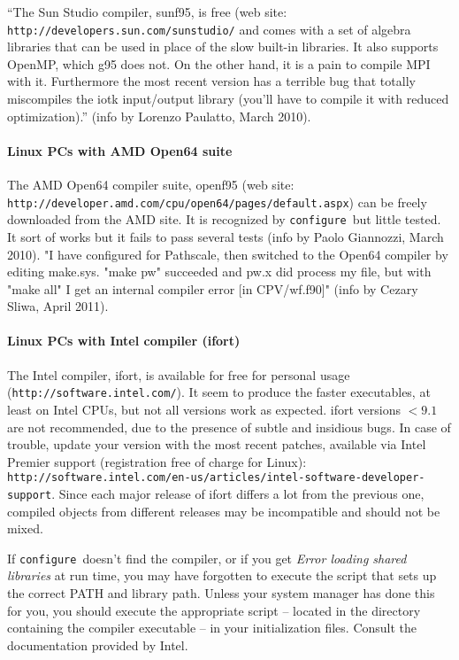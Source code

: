 \documentclass[12pt,a4paper]{article}
\def\configure{\texttt{configure}}
\begin{document}
``The Sun Studio compiler, sunf95, is free (web site:
\texttt{http://developers.sun.com/sunstudio/} and comes  
with a set of algebra libraries that can be used in place of the slow 
built-in libraries. It also supports OpenMP, which g95 does not. On the 
other hand, it is a pain to compile MPI with it. Furthermore the most
recent version has a terrible bug that totally miscompiles the iotk 
input/output library (you'll have to compile it with reduced optimization).''
(info by Lorenzo Paulatto, March 2010).

\paragraph{Linux PCs with AMD Open64 suite}

The AMD Open64 compiler suite, openf95 (web site:
\texttt{http://developer.amd.com/cpu/open64/pages/default.aspx})
can be freely downloaded from the AMD site.
It is recognized by \configure\ but little tested. It sort of works 
but it fails to pass several tests (info by Paolo Giannozzi, March 2010).
"I have configured for Pathscale, then switched to the Open64 compiler by 
editing make.sys. "make pw" succeeded and pw.x did process my file, but with 
"make all" I get an internal compiler error [in CPV/wf.f90]" (info by Cezary 
Sliwa, April 2011).

\paragraph{Linux PCs with Intel compiler (ifort)}

The Intel compiler, ifort, is available for free for personal 
usage (\texttt{http://software.intel.com/}). It seem to produce the faster executables, 
at least on Intel CPUs, but not all versions work as expected.
ifort versions $<9.1$ are not recommended, due to the presence of subtle 
and insidious bugs. In case of trouble, update your version with 
the most recent patches,
available via Intel Premier support (registration free of charge for Linux):
\texttt{http://software.intel.com/en-us/articles/intel-software-developer-support}.
Since each major release of ifort
differs a lot from the previous one, compiled objects from different 
releases may be incompatible and should not be mixed.    

If \configure\ doesn't find the compiler, or if you get 
{\em Error loading shared libraries} at run time, you may have 
forgotten to execute the script that
sets up the correct PATH and library path. Unless your system manager has
done this for you, you should execute the appropriate script -- located in
the directory containing the compiler executable -- in your
initialization files. Consult the documentation provided by Intel. 
    
\end{document}
